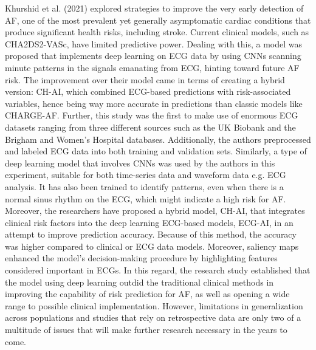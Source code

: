Khurshid et al.\cite{doi:10.1161/CIRCULATIONAHA.121.057480}  (2021) explored strategies to improve the very early detection of AF, one of the most prevalent yet generally asymptomatic cardiac conditions that produce significant health risks, including stroke. Current clinical models, such as CHA2DS2-VASc, have limited predictive power. Dealing with this, a model was proposed that implements deep learning on ECG data by using CNNs scanning minute patterns in the signals emanating from ECG, hinting toward future AF risk. The improvement over their model came in terms of creating a hybrid version: CH-AI, which combined ECG-based predictions with risk-associated variables, hence being way more accurate in predictions than classic models like CHARGE-AF. Further, this study was the first to make use of enormous ECG datasets ranging from three different sources such as the UK Biobank and the Brigham and Women's Hospital databases. Additionally, the authors preprocessed and labeled ECG data into both training and validation sets. Similarly, a type of deep learning model that involves CNNs was used by the authors in this experiment, suitable for both time-series data and waveform data e.g. ECG analysis. It has also been trained to identify patterns, even when there is a normal sinus rhythm on the ECG, which might indicate a high risk for AF. Moreover, the researchers have proposed a hybrid model, CH-AI, that integrates clinical risk factors into the deep learning ECG-based models, ECG-AI, in an attempt to improve prediction accuracy. Because of this method, the accuracy was higher compared to clinical or ECG data models. Moreover, saliency maps enhanced the model's decision-making procedure by highlighting features considered important in ECGs. In this regard, the research study established that the model using deep learning outdid the traditional clinical methods in improving the capability of risk prediction for AF, as well as opening a wide range to possible clinical implementation. However, limitations in generalization across populations and studies that rely on retrospective data are only two of a multitude of issues that will make further research necessary in the years to come.

\vspace{0.5cm}


